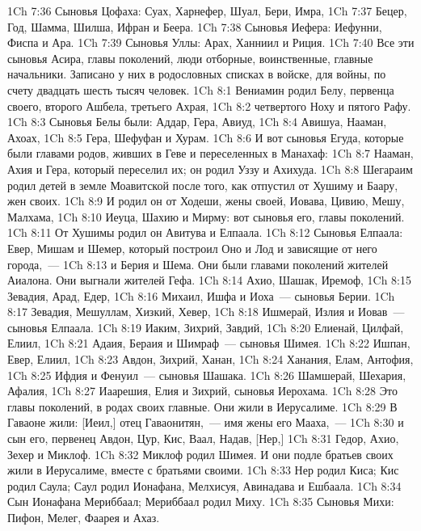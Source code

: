 \vs 1Ch 7:36 Сыновья Цофаха: Суах, Харнефер, Шуал, Бери, Имра,
\vs 1Ch 7:37 Бецер, Год, Шамма, Шилша, Ифран и Беера.
\vs 1Ch 7:38 Сыновья Иефера: Иефунни, Фиспа и Ара.
\vs 1Ch 7:39 Сыновья Уллы: Арах, Ханниил и Риция.
\vs 1Ch 7:40 Все эти сыновья Асира, главы поколений, люди отборные, воинственные, главные начальники. Записано у них в родословных списках в войске, для войны, по счету двадцать шесть тысяч человек.
\vs 1Ch 8:1 Вениамин родил Белу, первенца своего, второго Ашбела, третьего Ахрая,
\vs 1Ch 8:2 четвертого Ноху и пятого Рафу.
\vs 1Ch 8:3 Сыновья Белы были: Аддар, Гера, Авиуд,
\vs 1Ch 8:4 Авишуа, Нааман, Ахоах,
\vs 1Ch 8:5 Гера, Шефуфан и Хурам.
\rsbpar\vs 1Ch 8:6 И вот сыновья Егуда, которые были главами родов, живших в Геве и переселенных в Манахаф:
\vs 1Ch 8:7 Нааман, Ахия и Гера, который переселил их; он родил Уззу и Ахихуда.
\rsbpar\vs 1Ch 8:8 Шегараим родил детей в земле Моавитской после того, как отпустил от  Хушиму и Баару, жен своих.
\vs 1Ch 8:9 И родил он от Ходеши, жены своей, Иовава, Цивию, Мешу, Малхама,
\vs 1Ch 8:10 Иеуца, Шахию и Мирму: вот сыновья его, главы поколений.
\vs 1Ch 8:11 От Хушимы родил он Авитува и Елпаала.
\vs 1Ch 8:12 Сыновья Елпаала: Евер, Мишам и Шемер, который построил Оно и Лод и зависящие от него города,~---
\vs 1Ch 8:13 и Берия и Шема. Они были главами поколений жителей Аиалона. Они выгнали жителей Гефа.
\vs 1Ch 8:14 Ахио, Шашак, Иремоф,
\vs 1Ch 8:15 Зевадия, Арад, Едер,
\vs 1Ch 8:16 Михаил, Ишфа и Иоха~--- сыновья Берии.
\vs 1Ch 8:17 Зевадия, Мешуллам, Хизкий, Хевер,
\vs 1Ch 8:18 Ишмерай, Излия и Иовав~--- сыновья Елпаала.
\vs 1Ch 8:19 Иаким, Зихрий, Завдий,
\vs 1Ch 8:20 Елиенай, Цилфай, Елиил,
\vs 1Ch 8:21 Адаия, Бераия и Шимраф~--- сыновья Шимея.
\vs 1Ch 8:22 Ишпан, Евер, Елиил,
\vs 1Ch 8:23 Авдон, Зихрий, Ханан,
\vs 1Ch 8:24 Ханания, Елам, Антофия,
\vs 1Ch 8:25 Ифдия и Фенуил~--- сыновья Шашака.
\vs 1Ch 8:26 Шамшерай, Шехария, Афалия,
\vs 1Ch 8:27 Иаарешия, Елия и Зихрий, сыновья Иерохама.
\vs 1Ch 8:28 Это главы поколений, в родах своих главные. Они жили в Иерусалиме.
\rsbpar\vs 1Ch 8:29 В Гаваоне жили: [Иеил,] отец Гаваонитян,~--- имя жены его Мааха,~---
\vs 1Ch 8:30 и сын его, первенец Авдон,  Цур, Кис, Ваал, Надав, [Нер,]
\vs 1Ch 8:31 Гедор, Ахио, Зехер и Миклоф.
\vs 1Ch 8:32 Миклоф родил Шимея. И они подле братьев своих жили в Иерусалиме, вместе с братьями своими.
\vs 1Ch 8:33 Нер родил Киса; Кис родил Саула; Саул родил Ионафана, Мелхисуя, Авинадава и Ешбаала.
\vs 1Ch 8:34 Сын Ионафана Мериббаал; Мериббаал родил Миху.
\vs 1Ch 8:35 Сыновья Михи: Пифон, Мелег, Фаарея и Ахаз.
